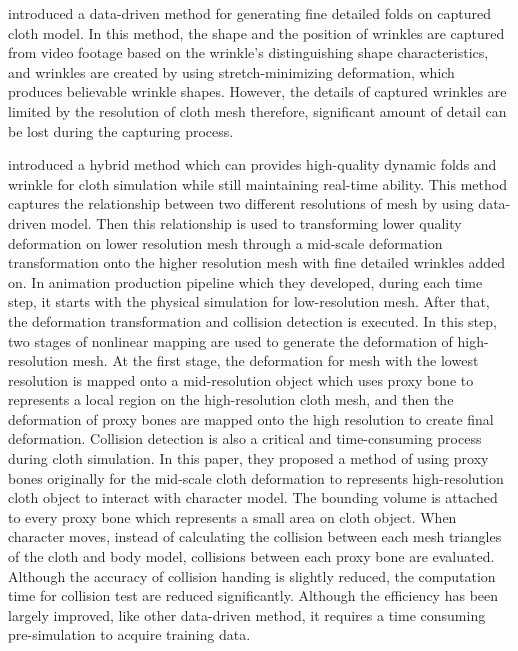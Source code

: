  introduced a data-driven method for generating fine detailed folds on captured cloth model. In this method, the shape and the position of wrinkles are captured from video footage based on the wrinkle's distinguishing shape characteristics, and wrinkles are created by using stretch-minimizing deformation, which produces believable wrinkle shapes. However, the details of captured wrinkles are limited by the resolution of cloth mesh therefore, significant amount of detail can be lost during the capturing process. 


 introduced a hybrid method which can provides high-quality dynamic folds and wrinkle for cloth simulation while still maintaining real-time ability. This method captures the relationship between two different resolutions of mesh by using data-driven model. Then this relationship is used to transforming lower quality deformation on lower resolution mesh through a mid-scale deformation transformation onto the higher resolution mesh with fine detailed wrinkles added on. In animation production pipeline which they developed, during each time step, it starts with the physical simulation for low-resolution mesh. After that, the deformation transformation and collision detection is executed. In this step, two stages of nonlinear mapping are used to generate the deformation of high-resolution mesh. At the first stage, the deformation for mesh with the lowest resolution is mapped onto a mid-resolution object which uses proxy bone to represents a local region on the high-resolution cloth mesh, and then the deformation of proxy bones are mapped onto the high resolution to create final deformation. Collision detection is also a critical and time-consuming process during cloth simulation. In this paper, they proposed a method of using proxy bones originally for the mid-scale cloth deformation to represents high-resolution cloth object to interact with character model. The bounding volume is attached to every proxy bone which represents a small area on cloth object. When character moves, instead of calculating the collision between each mesh triangles of the cloth and body model, collisions between each proxy bone are evaluated. Although the accuracy of collision handing is slightly reduced, the computation time for collision test are reduced significantly. Although the efficiency has been largely improved, like other data-driven method, it requires a time consuming pre-simulation to acquire training data. 


